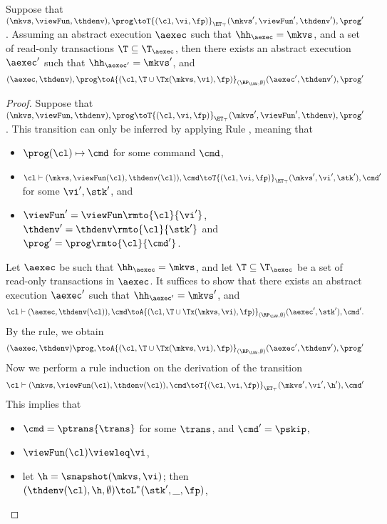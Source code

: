 \begin{proposition}
\label{prop:kv2aexec_transition}
Suppose that $(\mkvs, \viewFun, \thdenv), \prog \toT{(\cl, \vi, \fp)}_{\ET_{\top}} (\mkvs', 
\viewFun', \thdenv'), \prog'$. Assuming an abstract execution $\aexec$ 
such that $\hh_{\aexec} = \mkvs$, and a set of read-only transactions $\T \subseteq \T_{\aexec}$,
then there exists an abstract execution $\aexec'$ such that $\hh_{\aexec'} = \mkvs'$, and 
\[
(\aexec, \thdenv), \prog \toA{(\cl, \T \cup \Tx(\mkvs, \vi), \fp)}_{(\RP_{\LWW}, \emptyset)}
(\aexec', \thdenv'), \prog'
\]
\end{proposition}
\begin{proof}
Suppose that $(\mkvs, \viewFun, \thdenv), \prog \toT{(\cl, \vi, \fp)}_{\ET_{\top}} (\mkvs', \viewFun', \thdenv), \prog'$. 
This transition can only be inferred by applying Rule , meaning that 
\begin{itemize}
\item $\prog(\cl) \mapsto \cmd$ for some command $\cmd$, 
\item $\cl \vdash (\mkvs, \viewFun(\cl), \thdenv(\cl)), \cmd \toT{(\cl, \vi, \fp)}_{\ET_{\top}} (\mkvs', \vi', \stk'), \cmd'$ 
for some $\vi', \stk'$, and 
\item $\viewFun' = \viewFun\rmto{\cl}{\vi'}$, $\thdenv' = \thdenv\rmto{\cl}{\stk'}$ and $\prog' = \prog\rmto{\cl}{\cmd'}$. 
\end{itemize}
Let $\aexec$ be such that $\hh_{\aexec} = \mkvs$, and let $\T \subseteq \T_{\aexec}$ be a set of read-only transactions in $\aexec$. 
It suffices to show that there exists an abstract execution $\aexec'$ such that 
$\hh_{\aexec'} = \mkvs'$, and 
\[
    \cl \vdash (\aexec, \thdenv(\cl)), \cmd \toA{(\cl, \T \cup \Tx(\mkvs, \vi), \fp)}_{(\RP_{\LWW}, \emptyset)} (\aexec', \stk'), \cmd'.
\]
By the  rule, we obtain 
\[ 
    (\aexec, \thdenv) \prog, \toA{(\cl, \T \cup \Tx(\mkvs,\vi), \fp)}_{(\RP_{\LWW}, \emptyset)} (\aexec' ,\thdenv'), \prog'
\]
Now we perform a rule induction on the derivation of the transition 
\[
    \cl \vdash (\mkvs, \viewFun(\cl), \thdenv(\cl)), \cmd \toT{(\cl, \vi, \fp)}_{\ET_{\top}} (\mkvs', \vi', \h'), \cmd'
\]
This implies that 
\begin{itemize}
\item $\cmd = \ptrans{\trans}$ for some $\trans$, and $\cmd' = \pskip$,
\item $\viewFun(\cl) \viewleq \vi$, 
\item let $\h = \snapshot(\mkvs, \vi)$; then $(\thdenv(\cl), \h, \emptyset) \toL^{\ast} (\stk', \_, \fp)$, 

\end{itemize}
\end{proof}

